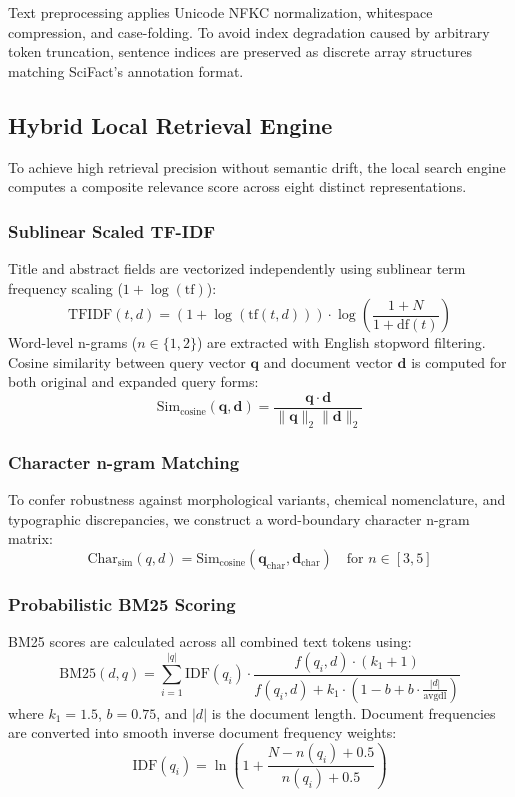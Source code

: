 \documentclass[conference]{IEEEtran}
\begin{document}
Text preprocessing applies Unicode NFKC normalization, whitespace compression, and case-folding. To avoid index degradation caused by arbitrary token truncation, sentence indices are preserved as discrete array structures matching SciFact's annotation format.

\subsection{Hybrid Local Retrieval Engine}
To achieve high retrieval precision without semantic drift, the local search engine computes a composite relevance score across eight distinct representations.

\subsubsection{Sublinear Scaled TF-IDF}
Title and abstract fields are vectorized independently using sublinear term frequency scaling ($1 + \log(\text{tf})$):
\begin{equation}
\text{TFIDF}(t, d) = (1 + \log(\text{tf}(t, d))) \cdot \log\left(\frac{1 + N}{1 + \text{df}(t)}\right)
\end{equation}
Word-level n-grams ($n \in \{1, 2\}$) are extracted with English stopword filtering. Cosine similarity between query vector $\mathbf{q}$ and document vector $\mathbf{d}$ is computed for both original and expanded query forms:
\begin{equation}
\text{Sim}_{\text{cosine}}(\mathbf{q}, \mathbf{d}) = \frac{\mathbf{q} \cdot \mathbf{d}}{\|\mathbf{q}\|_2 \|\mathbf{d}\|_2}
\end{equation}

\subsubsection{Character n-gram Matching}
To confer robustness against morphological variants, chemical nomenclature, and typographic discrepancies, we construct a word-boundary character n-gram matrix:
\begin{equation}
\text{Char}_{\text{sim}}(q, d) = \text{Sim}_{\text{cosine}}(\mathbf{q}_{\text{char}}, \mathbf{d}_{\text{char}}) \quad \text{for } n \in [3, 5]
\end{equation}

\subsubsection{Probabilistic BM25 Scoring}
BM25 scores are calculated across all combined text tokens using:
\begin{equation}
\text{BM25}(d, q) = \sum_{i=1}^{|q|} \text{IDF}(q_i) \cdot \frac{f(q_i, d) \cdot (k_1 + 1)}{f(q_i, d) + k_1 \cdot \left(1 - b + b \cdot \frac{|d|}{\text{avgdl}}\right)}
\end{equation}
where $k_1 = 1.5$, $b = 0.75$, and $|d|$ is the document length. Document frequencies are converted into smooth inverse document frequency weights:
\begin{equation}
\text{IDF}(q_i) = \ln\left(1 + \frac{N - n(q_i) + 0.5}{n(q_i) + 0.5}\right)
\end{equation}
\end{document}
